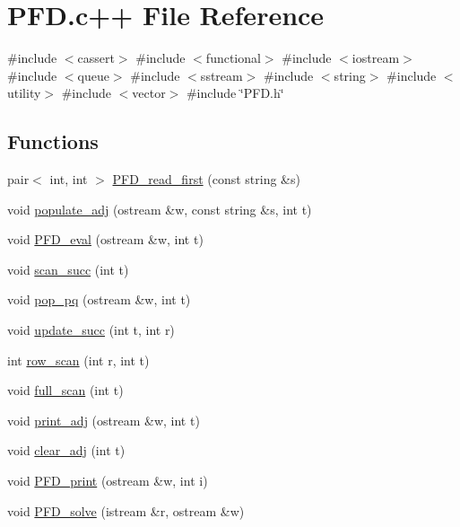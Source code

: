 \hypertarget{PFD_8c_09_09}{\section{\-P\-F\-D.\-c++ \-File \-Reference}
\label{PFD_8c_09_09}
}
{\ttfamily \#include $<$cassert$>$}\*
{\ttfamily \#include $<$functional$>$}\*
{\ttfamily \#include $<$iostream$>$}\*
{\ttfamily \#include $<$queue$>$}\*
{\ttfamily \#include $<$sstream$>$}\*
{\ttfamily \#include $<$string$>$}\*
{\ttfamily \#include $<$utility$>$}\*
{\ttfamily \#include $<$vector$>$}\*
{\ttfamily \#include \char`\"{}\-P\-F\-D.\-h\char`\"{}}\*
\subsection*{\-Functions}
\begin{DoxyCompactItemize}
\item 
pair$<$ int, int $>$ \hyperlink{PFD_8c_09_09_a30112234d2e1c7cc99b0347de4634a64}{\-P\-F\-D\-\_\-read\-\_\-first} (const string \&s)
\item 
void \hyperlink{PFD_8c_09_09_ae9be2b415f057d69ba790e8b77ba68f8}{populate\-\_\-adj} (ostream \&w, const string \&s, int t)
\item 
void \hyperlink{PFD_8c_09_09_a0f3ab5d3d0c8e2daabc28ac86413aee7}{\-P\-F\-D\-\_\-eval} (ostream \&w, int t)
\item 
void \hyperlink{PFD_8c_09_09_a6db4aa174c52fd40ff95c15db4fe8ea2}{scan\-\_\-succ} (int t)
\item 
void \hyperlink{PFD_8c_09_09_a7b524878900b6cc70510ffbbf1b215b2}{pop\-\_\-pq} (ostream \&w, int t)
\item 
void \hyperlink{PFD_8c_09_09_acc3c76d38b2635f3198c4579ed4c7cdc}{update\-\_\-succ} (int t, int r)
\item 
int \hyperlink{PFD_8c_09_09_a2cf9db34cf22c4986cef82cba813bcba}{row\-\_\-scan} (int r, int t)
\item 
void \hyperlink{PFD_8c_09_09_a2813c5892c655065c2b4caa39f3d33fb}{full\-\_\-scan} (int t)
\item 
void \hyperlink{PFD_8c_09_09_a44e85580a9180b5e5fbb9efb240d784c}{print\-\_\-adj} (ostream \&w, int t)
\item 
void \hyperlink{PFD_8c_09_09_a3ddcbebd407225ce57f7a7c41d477e24}{clear\-\_\-adj} (int t)
\item 
void \hyperlink{PFD_8c_09_09_a832724a8a941400d9c4a7f1b69bcf6c8}{\-P\-F\-D\-\_\-print} (ostream \&w, int i)
\item 
void \hyperlink{PFD_8c_09_09_ad1fb4f8285d98373eb99cc90453aa1df}{\-P\-F\-D\-\_\-solve} (istream \&r, ostream \&w)
\end{DoxyCompactItemize}
